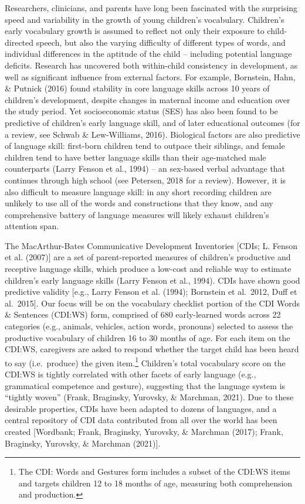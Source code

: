 \documentclass[10pt, letterpaper]{article}
\begin{document}
Researchers, clinicians, and parents have long been fascinated with the
surprising speed and variability in the growth of young children's
vocabulary. Children's early vocabulary growth is assumed to reflect not
only their exposure to child-directed speech, but also the varying
difficulty of different types of words, and individual differences in
the aptitude of the child -- including potential language deficits.
Research has uncovered both within-child consistency in development, as
well as significant influence from external factors. For example,
Bornstein, Hahn, \& Putnick (2016) found stability in core language
skills across 10 years of children's development, despite changes in
maternal income and education over the study period. Yet socioeconomic
status (SES) has also been found to be predictive of children's early
language skill, and of later educational outcomes (for a review, see
Schwab \& Lew-Williams, 2016). Biological factors are also predictive of
language skill: first-born children tend to outpace their siblings, and
female children tend to have better language skills than their
age-matched male counterparts (Larry Fenson et al., 1994) -- an
sex-based verbal advantage that continues through high school (see
Petersen, 2018 for a review). However, it is also difficult to measure
language skill: in any short recording children are unlikely to use all
of the words and constructions that they know, and any comprehensive
battery of language measures will likely exhaust children's attention
span.

The MacArthur-Bates Communicative Development Inventories {[}CDIs; L.
Fenson et al. (2007){]} are a set of parent-reported measures of
children's productive and receptive language skills, which produce a
low-cost and reliable way to estimate children's early language skills
(Larry Fenson et al., 1994). CDIs have shown good predictive validity
{[}e.g., Larry Fenson et al. (1994); Bornstein et al.~2012, Duff et
al.~2015{]}. Our focus will be on the vocabulary checklist portion of
the CDI Words \& Sentences (CDI:WS) form, comprised of 680 early-learned
words across 22 categories (e.g., animals, vehicles, action words,
pronouns) selected to assess the productive vocabulary of children 16 to
30 months of age. For each item on the CDI:WS, caregivers are asked to
respond whether the target child has been heard to say (i.e.~produce)
the given item.\footnote{The CDI: Words and Gestures form includes a
  subset of the CDI:WS items and targets children 12 to 18 months of
  age, measuring both comprehension and production.} Children's total
vocabulary score on the CDI:WS is tightly correlated with other facets
of early language (e.g., grammatical competence and gesture), suggesting
that the language system is ``tightly woven'' (Frank, Braginsky,
Yurovsky, \& Marchman, 2021). Due to these desirable properties, CDIs
have been adapted to dozens of languages, and a central repository of
CDI data contributed from all over the world has been created
{[}Wordbank; Frank, Braginsky, Yurovsky, \& Marchman (2017); Frank,
Braginsky, Yurovsky, \& Marchman (2021){]}.
\end{document}

